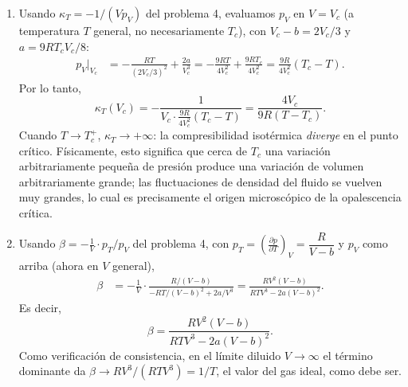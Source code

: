 \documentclass[12pt,a4paper]{article}
\newcommand{\paren}[1]{\left( #1 \right)}
\newcommand{\pd}[3]{\left(\frac{\partial #1}{\partial #2}\right)_{#3}}
\begin{document}
\begin{solucion}
\begin{enumerate}
            correspondientes):
            \begin{equation*}
                \boxed{\paren{\pi+\frac{3}{v^{2}}}(3v-1)=8t.}
            \end{equation*}
            \item[c)] Usando $\kappa_{T}=-1/(Vp_{V})$ del problema 4, evaluamos $p_{V}$ en
            $V=V_{c}$ (a temperatura $T$ general, no necesariamente $T_{c}$), con
            $V_{c}-b=2V_{c}/3$ y $a=9RT_{c}V_{c}/8$:
            \begin{align*}
                p_{V}\big|_{V_{c}}&=-\frac{RT}{(2V_{c}/3)^{2}}+\frac{2a}{V_{c}^{3}}
                =-\frac{9RT}{4V_{c}^{2}}+\frac{9RT_{c}}{4V_{c}^{2}}
                =\frac{9R}{4V_{c}^{2}}(T_{c}-T).
            \end{align*}
            Por lo tanto,
            \begin{equation*}
                \boxed{\kappa_{T}(V_{c})=-\frac{1}{V_{c}\cdot\frac{9R}{4V_{c}^{2}}(T_{c}-T)}=\frac{4V_{c}}{9R(T-T_{c})}.}
            \end{equation*}
            Cuando $T\to T_{c}^{+}$, $\kappa_{T}\to+\infty$: la compresibilidad isotérmica
            \emph{diverge} en el punto crítico. Físicamente, esto significa que cerca de $T_{c}$
            una variación arbitrariamente pequeña de presión produce una variación de volumen
            arbitrariamente grande; las fluctuaciones de densidad del fluido se vuelven muy
            grandes, lo cual es precisamente el origen microscópico de la opalescencia crítica.
            \item[d)] Usando $\beta=-\frac1V\cdot p_{T}/p_{V}$ del problema 4, con
            $p_{T}=\pd pTV=\dfrac{R}{V-b}$ y $p_{V}$ como arriba (ahora en $V$ general),
            \begin{align*}
                \beta&=-\frac1V\cdot\frac{R/(V-b)}{-RT/(V-b)^{2}+2a/V^{3}}
                =\frac{RV^{2}(V-b)}{RTV^{3}-2a(V-b)^{2}}.
            \end{align*}
            Es decir,
            \begin{equation*}
                \boxed{\beta=\frac{RV^{2}(V-b)}{RTV^{3}-2a(V-b)^{2}}.}
            \end{equation*}
            Como verificación de consistencia, en el límite diluido $V\to\infty$ el término
            dominante da $\beta\to RV^{3}/(RTV^{3})=1/T$, el valor del gas ideal, como debe ser.
        \end{enumerate}
    \end{solucion}
\end{document}
